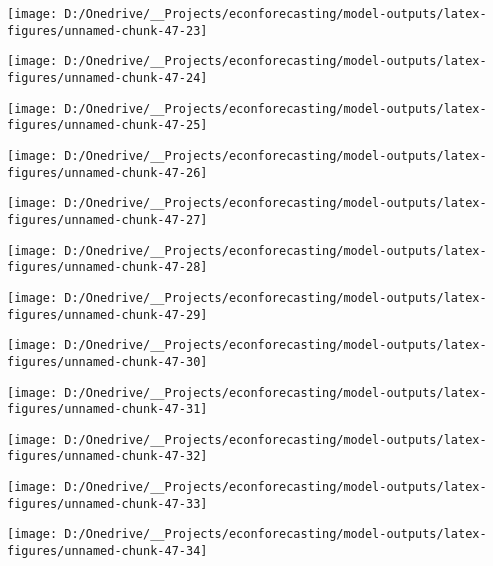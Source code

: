 \documentclass[11pt, letterpaper]{article}\usepackage[]{graphicx}\usepackage[]{color}
\begin{document}
{\centering \texttt{[image: D:/Onedrive/\_\_Projects/econforecasting/model-outputs/latex-figures/unnamed-chunk-47-23]} 

}




{\centering \texttt{[image: D:/Onedrive/\_\_Projects/econforecasting/model-outputs/latex-figures/unnamed-chunk-47-24]} 

}




{\centering \texttt{[image: D:/Onedrive/\_\_Projects/econforecasting/model-outputs/latex-figures/unnamed-chunk-47-25]} 

}




{\centering \texttt{[image: D:/Onedrive/\_\_Projects/econforecasting/model-outputs/latex-figures/unnamed-chunk-47-26]} 

}




{\centering \texttt{[image: D:/Onedrive/\_\_Projects/econforecasting/model-outputs/latex-figures/unnamed-chunk-47-27]} 

}




{\centering \texttt{[image: D:/Onedrive/\_\_Projects/econforecasting/model-outputs/latex-figures/unnamed-chunk-47-28]} 

}




{\centering \texttt{[image: D:/Onedrive/\_\_Projects/econforecasting/model-outputs/latex-figures/unnamed-chunk-47-29]} 

}




{\centering \texttt{[image: D:/Onedrive/\_\_Projects/econforecasting/model-outputs/latex-figures/unnamed-chunk-47-30]} 

}




{\centering \texttt{[image: D:/Onedrive/\_\_Projects/econforecasting/model-outputs/latex-figures/unnamed-chunk-47-31]} 

}




{\centering \texttt{[image: D:/Onedrive/\_\_Projects/econforecasting/model-outputs/latex-figures/unnamed-chunk-47-32]} 

}




{\centering \texttt{[image: D:/Onedrive/\_\_Projects/econforecasting/model-outputs/latex-figures/unnamed-chunk-47-33]} 

}




{\centering \texttt{[image: D:/Onedrive/\_\_Projects/econforecasting/model-outputs/latex-figures/unnamed-chunk-47-34]} 

}
\end{document}
